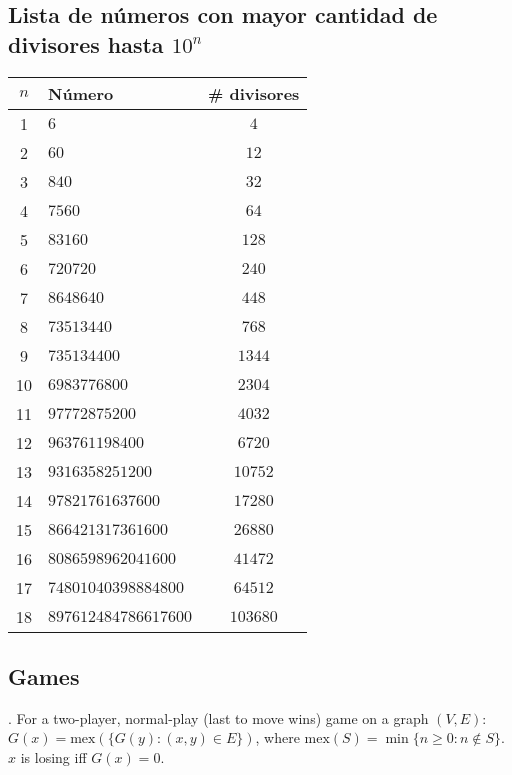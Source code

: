 \subsection{Lista de números con mayor cantidad de divisores hasta $10^n$}
\begin{center}
\begin{tabular}{|c|l|c|}
\hline
$n$ & Número & \# divisores \\ \hline
1  & $6$                      & $4$     \\ \hline
2  & $60$                     & $12$    \\ \hline
3  & $840$                    & $32$    \\ \hline
4  & $7560$                   & $64$    \\ \hline
5  & $83160$                  & $128$   \\ \hline
6  & $720720$                 & $240$   \\ \hline
7  & $8648640$                & $448$   \\ \hline
8  & $73513440$               & $768$   \\ \hline
9  & $735134400$              & $1344$  \\ \hline
10 & $6983776800$             & $2304$  \\ \hline
11 & $97772875200$            & $4032$  \\ \hline
12 & $963761198400$           & $6720$  \\ \hline
13 & $9316358251200$          & $10752$ \\ \hline
14 & $97821761637600$         & $17280$ \\ \hline
15 & $866421317361600$        & $26880$ \\ \hline
16 & $8086598962041600$       & $41472$ \\ \hline
17 & $74801040398884800$      & $64512$ \\ \hline
18 & $897612484786617600$     & $103680$\\ \hline
\end{tabular}
\end{center}

\subsection{Games}

.
For a two-player, normal-play (last to move wins) game on a graph $(V,E)$:
$G(x) = \mbox{mex}(\{ G(y) : (x, y) \in E \})$,
where $\mbox{mex}(S) = \min \{ n \ge 0: n \not\in S \}$.
$x$ is losing iff $G(x) = 0$.

